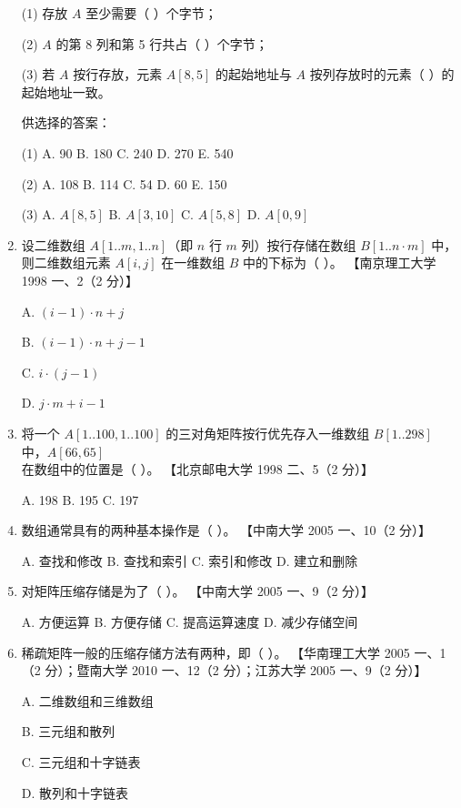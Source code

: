 \documentclass[lang=cn,newtx,10pt,scheme=chinese]{elegantbook}
\begin{document}
\begin{enumerate}
    (1) 存放 $A$ 至少需要（ ）个字节；  

    (2) $A$ 的第 8 列和第 5 行共占（ ）个字节；  

    (3) 若 $A$ 按行存放，元素 $A[8,5]$ 的起始地址与 $A$ 按列存放时的元素（ ）的起始地址一致。  

    供选择的答案：  

    (1) A. 90 \quad B. 180 \quad C. 240 \quad D. 270 \quad E. 540  

    (2) A. 108 \quad B. 114 \quad C. 54 \quad D. 60 \quad E. 150  

    (3) A. $A[8,5]$ \quad B. $A[3,10]$ \quad C. $A[5,8]$ \quad D. $A[0,9]$  

    \item 设二维数组 $A[1..m, 1..n]$（即 $n$ 行 $m$ 列）按行存储在数组 $B[1..n \cdot m]$ 中，则二维数组元素 $A[i,j]$ 在一维数组 $B$ 中的下标为（ ）。  
    【南京理工大学 1998 一、2（2 分）】  

    A. $(i-1) \cdot n + j$  

    B. $(i-1) \cdot n + j - 1$  

    C. $i \cdot (j - 1)$  

    D. $j \cdot m + i - 1$  

    \item 将一个 $A[1..100, 1..100]$ 的三对角矩阵按行优先存入一维数组 $B[1..298]$ 中，$A[66,65]$ 在数组中的位置是（ ）。  
    【北京邮电大学 1998 二、5（2 分）】  

    A. 198 \quad B. 195 \quad C. 197  

    \item 数组通常具有的两种基本操作是（ ）。  
    【中南大学 2005 一、10（2 分）】  

    A. 查找和修改 \quad B. 查找和索引 \quad C. 索引和修改 \quad D. 建立和删除  

    \item 对矩阵压缩存储是为了（ ）。  
    【中南大学 2005 一、9（2 分）】  

    A. 方便运算 \quad B. 方便存储 \quad C. 提高运算速度 \quad D. 减少存储空间  

    \item 稀疏矩阵一般的压缩存储方法有两种，即（ ）。  
    【华南理工大学 2005 一、1（2 分）；暨南大学 2010 一、12（2 分）；江苏大学 2005 一、9（2 分）】  

    A. 二维数组和三维数组  

    B. 三元组和散列  

    C. 三元组和十字链表  

    D. 散列和十字链表  


\end{enumerate}
\end{document}
